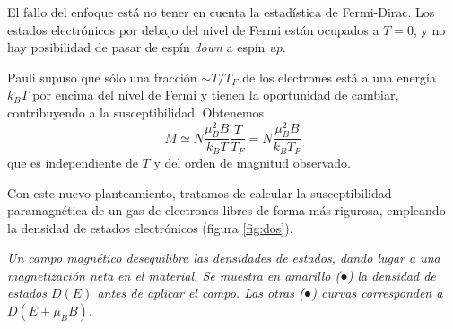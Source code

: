 \documentclass{tufte-book}
\newcommand{\sub}[1]{_{{\scriptscriptstyle\mathit{#1}}}}
\newcommand{\kb}{k\sub{B}}
\newcommand{\mb}{μ\sub{B}}
\begin{document}
El fallo del enfoque está no tener en cuenta la estadística de
Fermi-Dirac. Los estados electrónicos por debajo del nivel de Fermi
están ocupados a $T=0$, y no hay posibilidad de pasar de espín
\textit{down} a espín \textit{up}.

Pauli supuso que sólo una fracción $∼T/T\sub{F}$ de los electrones
está a una energía $\kb T$ por encima del nivel de Fermi y tienen la
oportunidad de cambiar, contribuyendo a la susceptibilidad. Obtenemos
\begin{equation}
  M  ≃ N \frac{\mb^2 B}{\kb T}\frac{T}{T\sub{F}} =
  N\frac{\mb^2 B}{\kb T\sub{F}}
  \label{eq:cutre}
\end{equation}
que es independiente de $T$ y del orden de magnitud observado.

Con este nuevo planteamiento, tratamos de calcular la susceptibilidad
paramagnética de un gas de electrones libres de forma más rigurosa,
empleando la densidad de estados electrónicos (figura \ref{fig:dos}).

\begin{marginfigure}
  \centering
  \caption{\itshape Un campo magnético desequilibra las densidades de
    estados, dando lugar a una magnetización neta en el material. Se
    muestra en amarillo (\textcolor{PlotSecondary}{●}) la densidad de
    estados $D(E)$ antes de aplicar el campo. Las otras
    (\textcolor{PlotDefault}{●}) curvas corresponden a $D(E±\mb B)$.}
  \label{fig:dos}
\end{marginfigure}
\end{document}
